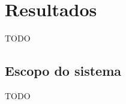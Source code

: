 
\chapter{Resultados}\label{cap:resultados}

TODO



\section{Escopo do sistema}\label{sec:escopoSistema}

TODO




